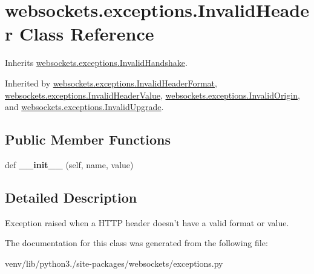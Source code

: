 \hypertarget{classwebsockets_1_1exceptions_1_1_invalid_header}{}\section{websockets.\+exceptions.\+Invalid\+Header Class Reference}
\label{classwebsockets_1_1exceptions_1_1_invalid_header}


Inherits \hyperlink{classwebsockets_1_1exceptions_1_1_invalid_handshake}{websockets.\+exceptions.\+Invalid\+Handshake}.



Inherited by \hyperlink{classwebsockets_1_1exceptions_1_1_invalid_header_format}{websockets.\+exceptions.\+Invalid\+Header\+Format}, \hyperlink{classwebsockets_1_1exceptions_1_1_invalid_header_value}{websockets.\+exceptions.\+Invalid\+Header\+Value}, \hyperlink{classwebsockets_1_1exceptions_1_1_invalid_origin}{websockets.\+exceptions.\+Invalid\+Origin}, and \hyperlink{classwebsockets_1_1exceptions_1_1_invalid_upgrade}{websockets.\+exceptions.\+Invalid\+Upgrade}.

\subsection*{Public Member Functions}
\begin{DoxyCompactItemize}
\item 
\mbox{\label{classwebsockets_1_1exceptions_1_1_invalid_header_ac29ff21ceb7e3a988d596e724cb0dd6c}} 
def {\bfseries \+\_\+\+\_\+init\+\_\+\+\_\+} (self, name, value)
\end{DoxyCompactItemize}


\subsection{Detailed Description}
\begin{DoxyVerb}Exception raised when a HTTP header doesn't have a valid format or value.\end{DoxyVerb}
 

The documentation for this class was generated from the following file\+:\begin{DoxyCompactItemize}
\item 
venv/lib/python3./site-\/packages/websockets/exceptions.\+py\end{DoxyCompactItemize}
